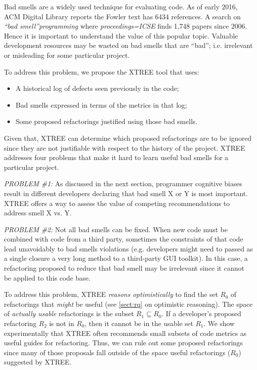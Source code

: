 \documentclass{sig-alternate}
\newcommand{\tion}[1]{\textsection\ref{sect:#1}}
\theoremstyle{break}
\begin{document}
Bad smells are a widely used technique for evaluating code. As of  early 2016, ACM Digital Library reports 
the Fowler text has 6434 references. A search  on {\em ``bad smell''programming} 
where {\em proceedings=ICSE} finds 1,748 papers since 2006.
Hence it is important to understand the value of
this popular topic.  
Valuable development resources may be wasted on bad smells that are ``bad''; i.e. 
 irrelevant or misleading
for some particular project.

To address this problem, we propose the XTREE
tool that uses: 
     \begin{itemize}
         \item A historical log of defects seen previously in the code;
         \item  Bad smells expressed in terms of the 
          metrics   in that log;
         \item Some proposed refactorings justified using those bad smells.
     \end{itemize}
Given that,  XTREE can determine which
  proposed refactorings are to be ignored
since they are not justifiable  
with respect to the history of the project. XTREE addresses four problems that  make it hard to  learn useful
bad smells for a particular project.

{\em PROBLEM \#1:} As discussed in the next section, programmer
   cognitive biases result in different
developers declaring that
bad smell X or Y is most important. 
 XTREE offers a way to assess the value of competing recommendations to address smell X vs. Y.
  

{\em PROBLEM \#2:} Not all bad smells can be fixed. 
When new code must
be combined with code from a third party, 
sometimes the constraints of that code 
lead unavoidably to bad smells violations (e.g.
developers might need to passed as a single closure a  very long method
to  a third-party GUI toolkit).   In this case,
a refactoring proposed to reduce that bad smell
may be irrelevant since it cannot be applied to this code base.

To address this problem, XTREE {\em reasons optimistically} to find the set
$R_0$ of refactorings that \textit{might} be useful (see \tion{rq} on optimistic reasoning).
The space of \textit{actually usable} refactorings is 
the subset $R_1 \subseteq R_0$.
If a developer's proposed refactoring $R_2$ is
not in $R_0$, then it cannot be in the usable
set $R_1$.  We show experimentally that XTREE
often recommends small subsets of
code metrics as useful guides for refactoring. Thus, we
can rule out some proposed refactorings
since many of those proposals fall outside of the space
useful refactorings ($R_0$) suggested by XTREE.  
\end{document}
